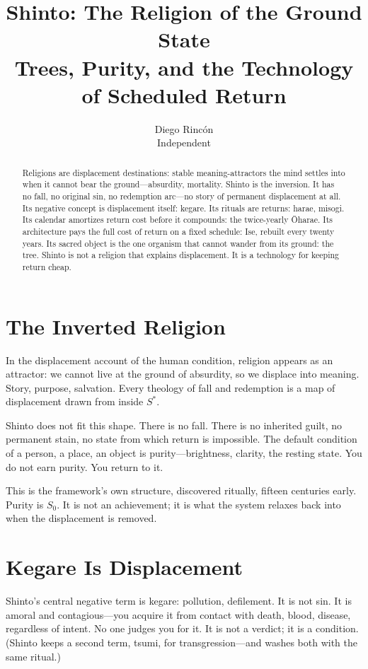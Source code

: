 \documentclass[12pt]{article}
\title{Shinto: The Religion of the Ground State\\
\large Trees, Purity, and the Technology of Scheduled Return}
\author{Diego Rincón\\
\small Independent}
\date{}
\begin{document}
\maketitle

\begin{abstract}
Religions are displacement destinations: stable meaning-attractors the mind settles into when it cannot bear the ground---absurdity, mortality. Shinto is the inversion. It has no fall, no original sin, no redemption arc---no story of permanent displacement at all. Its negative concept is displacement itself: kegare. Its rituals are returns: harae, misogi. Its calendar amortizes return cost before it compounds: the twice-yearly Ōharae. Its architecture pays the full cost of return on a fixed schedule: Ise, rebuilt every twenty years. Its sacred object is the one organism that cannot wander from its ground: the tree. Shinto is not a religion that explains displacement. It is a technology for keeping return cheap.
\end{abstract}

\section{The Inverted Religion}

In the displacement account of the human condition, religion appears as an attractor: we cannot live at the ground of absurdity, so we displace into meaning. Story, purpose, salvation. Every theology of fall and redemption is a map of displacement drawn from inside $S^*$.

Shinto does not fit this shape. There is no fall. There is no inherited guilt, no permanent stain, no state from which return is impossible. The default condition of a person, a place, an object is purity---brightness, clarity, the resting state. You do not earn purity. You return to it.

This is the framework's own structure, discovered ritually, fifteen centuries early. Purity is $S_0$. It is not an achievement; it is what the system relaxes back into when the displacement is removed.

\section{Kegare Is Displacement}

Shinto's central negative term is kegare: pollution, defilement. It is not sin. It is amoral and contagious---you acquire it from contact with death, blood, disease, regardless of intent. No one judges you for it. It is not a verdict; it is a condition. (Shinto keeps a second term, tsumi, for transgression---and washes both with the same ritual.)
\end{document}
